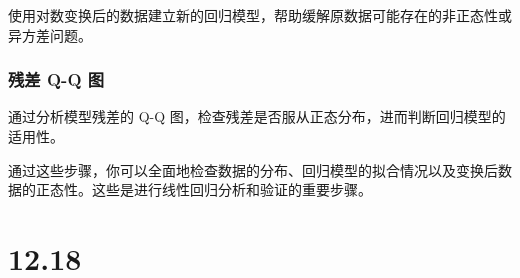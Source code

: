\documentclass[UTF8]{report}
\theoremstyle{MyLineTheoremStyle} %
\theoremstyle{MyBlockTheoremStyle} %
\theoremstyle{MySubsubsectionStyle} %
\begin{document}
使用对数变换后的数据建立新的回归模型，帮助缓解原数据可能存在的非正态性或异方差问题。

\subsection*{残差 Q-Q 图}

通过分析模型残差的 Q-Q 图，检查残差是否服从正态分布，进而判断回归模型的适用性。

通过这些步骤，你可以全面地检查数据的分布、回归模型的拟合情况以及变换后数据的正态性。这些是进行线性回归分析和验证的重要步骤。

\cleardoublepage
\chapter{12.18}
\end{document}

